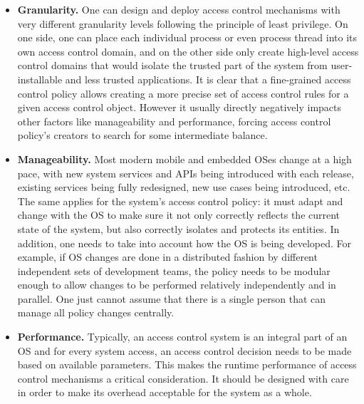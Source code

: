 \begin{itemize}
	\item \textbf{Granularity.} One can design and deploy access control mechanisms with very different granularity levels following the principle of least privilege. On one side, one can place each individual process or even process thread into its own access control domain, and on the other side only create high-level access control domains that would isolate the trusted part of the system from user-installable and less trusted applications. It is clear that a fine-grained access control policy allows creating a more precise set of access control rules for a given access control object. However it usually directly negatively impacts other factors like manageability and performance, forcing access control policy's creators to search for some intermediate balance.
	\item \textbf{Manageability.} Most modern mobile and embedded OSes change at a high pace, with new system services and APIs being introduced with each release, existing services being fully redesigned, new use cases being introduced, etc. The same applies for the system's access control policy: it must adapt and change with the OS to make sure it not only correctly reflects the current state of the system, but also correctly isolates and protects its entities. In addition, one needs to take into account how the OS is being developed. For example, if OS changes are done in a distributed fashion by different independent sets of development teams, the policy needs to be modular enough to allow changes to be performed relatively independently and in parallel. One just cannot assume that there is a single person that can manage all policy changes centrally.  
	\item \textbf{Performance.} Typically, an access control system is an integral part of an OS and for every system access, an access control decision needs to be made based on available parameters. This makes the runtime performance of access control mechanisms a critical consideration. It should be designed with care in order to make its overhead acceptable for the system as a whole.  
\end{itemize}

